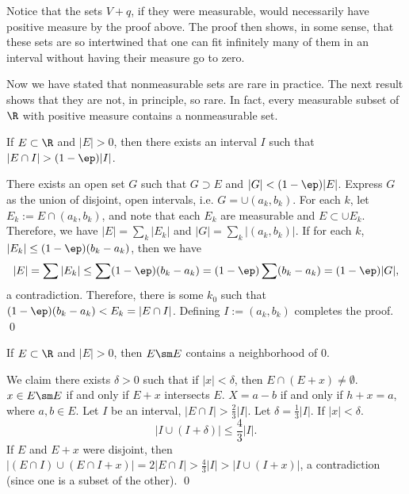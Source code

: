 Notice that the sets $V+q$, if they were measurable, would necessarily have positive measure by the proof above. The proof then shows, in some sense, that these sets are so intertwined that one can fit infinitely many of them in an interval without having their measure go to zero. 

















Now we have stated that nonmeasurable sets are rare in practice. The next result shows that they are not, in principle, so rare. In fact, every measurable subset of $\R$ with positive measure contains a nonmeasurable set. 


\begin{lem} \label{lem:density}
If $E \subset \R$ and $|E|>0$, then there exists an interval $I$ such that $|E \cap I|> (1-\ep) |I|$. 
\end{lem}

\pf There exists an open set $G$ such that $G \supset E$ and $|G|< (1-\ep) |E|$. Express $G$ as the union of disjoint, open intervals, i.e. $G= \cup (a_k,b_k)$. For each $k$, let $E_k:= E \cap (a_k,b_k)$, and note that each $E_k$ are measurable and $E \subset  \cup E_k$. Therefore, we have $|E|= \sum_k |E_k|$ and $|G|= \sum_k |(a_k,b_k)|$. If for each $k$, $|E_k| \leq (1-\ep)(b_k-a_k)$, then we have 
	\[
	|E|= \sum |E_k| \leq \sum (1-\ep)(b_k-a_k)= (1-\ep) \sum (b_k-a_k)= (1-\ep) |G|,
	\]
a contradiction. Therefore, there is some $k_0$ such that $(1-\ep)(b_k-a_k)<E_k=|E \cap I|$. Defining $I:=(a_k,b_k)$ completes the proof. \qed \\





\begin{lem} \label{lem:subzero}
If $E \subset \R$ and $|E|>0$, then $E \sm E$ contains a neighborhood of 0. 
\end{lem}



\pf We claim there exists $\delta>0$ such that if $|x|<\delta$, then $E \cap (E+x) \neq \emptyset$. $x \in E \sm E$ if and only if $E+x$ intersects $E$. $X= a-b$ if and only if $h+x=a$, where $a,b \in E$. Let $I$ be an interval, $|E \cap I|> \frac{2}{3} |I|$. Let $\delta= \frac{1}{3} |I|$. If $|x|<\delta$.
	\[
	|I \cup (I+\delta)| \leq \frac{4}{3} |I|. 
	\]
If $E$ and $E+x$ were disjoint, then $| (E \cap I) \cup (E \cap I +x)|= 2|E \cap I|> \frac{4}{3} |I|> |I \cup (I+x)|$, a contradiction (since one is a subset of the other). \qed \\



